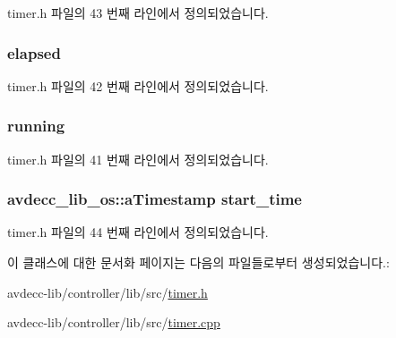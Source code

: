 timer.\+h 파일의 43 번째 라인에서 정의되었습니다.

\subsubsection[{\texorpdfstring{elapsed}{elapsed}}]{ elapsed\hspace{0.3cm}{\ttfamily [private]}}\hypertarget{classavdecc__lib_1_1timer_a652e9237b894ca5051a477580040c199}{}\label{classavdecc__lib_1_1timer_a652e9237b894ca5051a477580040c199}


timer.\+h 파일의 42 번째 라인에서 정의되었습니다.

\subsubsection[{\texorpdfstring{running}{running}}]{ running\hspace{0.3cm}{\ttfamily [private]}}\hypertarget{classavdecc__lib_1_1timer_a36f7b6be7108281af77939ceaec42fd6}{}\label{classavdecc__lib_1_1timer_a36f7b6be7108281af77939ceaec42fd6}


timer.\+h 파일의 41 번째 라인에서 정의되었습니다.

\subsubsection[{\texorpdfstring{start\+\_\+time}{start_time}}]{\setlength{\rightskip}{0pt plus 5cm}avdecc\+\_\+lib\+\_\+os\+::a\+Timestamp start\+\_\+time\hspace{0.3cm}{\ttfamily [private]}}\hypertarget{classavdecc__lib_1_1timer_a010b4f6ecdcf4058327bd0c752d94b91}{}\label{classavdecc__lib_1_1timer_a010b4f6ecdcf4058327bd0c752d94b91}


timer.\+h 파일의 44 번째 라인에서 정의되었습니다.



이 클래스에 대한 문서화 페이지는 다음의 파일들로부터 생성되었습니다.\+:\begin{DoxyCompactItemize}
\item 
avdecc-\/lib/controller/lib/src/\hyperlink{timer_8h}{timer.\+h}\item 
avdecc-\/lib/controller/lib/src/\hyperlink{timer_8cpp}{timer.\+cpp}\end{DoxyCompactItemize}
